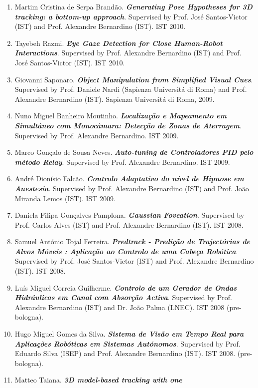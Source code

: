 \documentclass[
]{article}
\begin{document}
\begin{enumerate}
  2010.
\item
  Martim Cristina de Serpa Brandão. \emph{\textbf{Generating Pose
  Hypotheses for 3D tracking: a bottom-up approach}}. Supervised by
  Prof. José Santos-Victor (IST) and Prof. Alexandre Bernardino (IST).
  IST 2010.
\item
  Tayebeh Razmi. \emph{\textbf{Eye Gaze Detection for Close Human-Robot
  Interactions}}. Supervised by Prof. Alexandre Bernardino (IST) and
  Prof. José Santos-Victor (IST). IST 2010.
\item
  Giovanni Saponaro. \emph{\textbf{Object Manipulation from Simplified
  Visual Cues}}. Supervised by Prof. Daniele Nardi (Sapienza Universitá
  di Roma) and Prof. Alexandre Bernardino (IST). Sapienza Universitá di
  Roma, 2009.
\item
  Nuno Miguel Banheiro Moutinho. \emph{\textbf{Localização e Mapeamento
  em Simultâneo com Monocâmara: Detecção de Zonas de Aterragem}}.
  Supervised by Prof. Alexandre Bernardino. IST 2009.
\item
  Marco Gonçalo de Sousa Neves. \emph{\textbf{Auto-tuning de
  Controladores PID pelo método Relay}}. Supervised by Prof. Alexandre
  Bernardino. IST 2009.
\item
  André Dionísio Falcão. \emph{\textbf{Controlo Adaptativo do nível de
  Hipnose em Anestesia}}. Supervised by Prof. Alexandre Bernardino (IST)
  and Prof. João Miranda Lemos (IST). IST 2009.
\item
  Daniela Filipa Gonçalves Pamplona. \emph{\textbf{Gaussian Foveation}}.
  Supervised by Prof. Carlos Alves (IST) and Prof. Alexandre Bernardino
  (IST). IST 2008.
\item
  Samuel António Tojal Ferreira. \emph{\textbf{Predtrack - Predição de
  Trajectórias de Alvos Móveis : Aplicação ao Controlo de uma Cabeça
  Robótica}}. Supervised by Prof. José Santos-Victor (IST) and Prof.
  Alexandre Bernardino (IST). IST 2008.
\item
  Luís Miguel Correia Guilherme. \emph{\textbf{Controlo de um Gerador de
  Ondas Hidráulicas em Canal com Absorção Activa}}. Supervised by Prof.
  Alexandre Bernardino (IST) and Dr. João Palma (LNEC). IST 2008
  (pre-bologna).
\item
  Hugo Miguel Gomes da Silva. \emph{\textbf{Sistema de Visão em Tempo
  Real para Aplicações Robóticas em Sistemas Autónomos}}. Supervised by
  Prof. Eduardo Silva (ISEP) and Prof. Alexandre Bernardino (IST). IST
  2008. (pre-bologna).
\item
  Matteo Taiana. \emph{\textbf{3D model-based tracking with one
}}
\end{enumerate}
\end{document}
